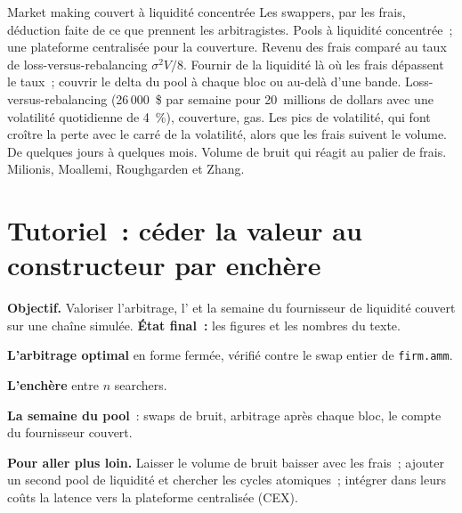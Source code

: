 \begin{strategyfile}{Market making couvert à liquidité concentrée}\label{strat:hf:on-chain-trading:hedgedlp}
 Les swappers, par les frais, déduction faite de ce que prennent les arbitragistes.
 Pools à liquidité concentrée~; une plateforme centralisée pour la couverture.
 Revenu des frais comparé au taux de loss-versus-rebalancing $\sigma^2V/8$.
 Fournir de la liquidité là où les frais dépassent le taux~; couvrir le delta du pool à chaque bloc ou au-delà d'une bande.
 Loss-versus-rebalancing (26\,000~\$ par semaine pour 20~millions de dollars avec une volatilité quotidienne de 4~\%), couverture, gas.
 Les pics de volatilité, qui font croître la perte avec le carré de la volatilité, alors que les frais suivent le volume.
 De quelques jours à quelques mois.
 Volume de bruit qui réagit au palier de frais.
 Milionis, Moallemi, Roughgarden et Zhang.
\end{strategyfile}

\section{Tutoriel~: céder la valeur au constructeur par enchère}\label{tut:hf:on-chain-trading:tut}

\begin{tutorial}
\textbf{Objectif.} Valoriser l'arbitrage, l' et la semaine du fournisseur de liquidité couvert sur une chaîne simulée. \textbf{État final~:} les
figures et les nombres du texte.
\begin{tutsteps}
\item \textbf{L'arbitrage optimal} en forme fermée, vérifié contre le swap entier de \texttt{firm.amm}.
\label{lst:hf:on-chain-trading:arb}
\item \textbf{L'enchère} entre $n$ searchers.
\label{lst:hf:on-chain-trading:auction}
\item \textbf{La semaine du pool}~: swaps de bruit, arbitrage après chaque bloc, le compte du fournisseur couvert.
\label{lst:hf:on-chain-trading:pool}
\end{tutsteps}
\textbf{Pour aller plus loin.} Laisser le volume de bruit baisser avec les frais~; ajouter un second pool de liquidité et chercher les cycles atomiques~; intégrer dans leurs coûts la latence vers la
plateforme centralisée (CEX).
\end{tutorial}

